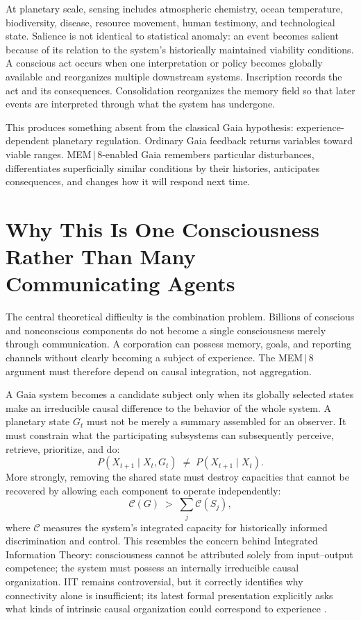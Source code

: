 \documentclass[11pt]{article}
\begin{document}
At planetary scale, sensing includes atmospheric chemistry, ocean temperature, biodiversity, disease, resource movement, human testimony, and technological state. Salience is not identical to statistical anomaly: an event becomes salient because of its relation to the system's historically maintained viability conditions. A conscious act occurs when one interpretation or policy becomes globally available and reorganizes multiple downstream systems. Inscription records the act and its consequences. Consolidation reorganizes the memory field so that later events are interpreted through what the system has undergone.

This produces something absent from the classical Gaia hypothesis: experience-dependent planetary regulation. Ordinary Gaia feedback returns variables toward viable ranges. MEM\,$|$\,8-enabled Gaia remembers particular disturbances, differentiates superficially similar conditions by their histories, anticipates consequences, and changes how it will respond next time.

\section{Why This Is One Consciousness Rather Than Many Communicating Agents}
\label{sec:causal-integration}

The central theoretical difficulty is the combination problem. Billions of conscious and nonconscious components do not become a single consciousness merely through communication. A corporation can possess memory, goals, and reporting channels without clearly becoming a subject of experience. The MEM\,$|$\,8 argument must therefore depend on causal integration, not aggregation.

A Gaia system becomes a candidate subject only when its globally selected states make an irreducible causal difference to the behavior of the whole system. A planetary state $G_t$ must not be merely a summary assembled for an observer. It must constrain what the participating subsystems can subsequently perceive, retrieve, prioritize, and do:
\[
P(X_{t+1} \mid X_t, G_t) \;\neq\; P(X_{t+1} \mid X_t).
\]
More strongly, removing the shared state must destroy capacities that cannot be recovered by allowing each component to operate independently:
\[
\mathcal{C}(G) \;>\; \sum_j \mathcal{C}(S_j),
\]
where $\mathcal{C}$ measures the system's integrated capacity for historically informed discrimination and control. This resembles the concern behind Integrated Information Theory: consciousness cannot be attributed solely from input--output competence; the system must possess an internally irreducible causal organization. IIT remains controversial, but it correctly identifies why connectivity alone is insufficient; its latest formal presentation explicitly asks what kinds of intrinsic causal organization could correspond to experience \cite{albantakis2023}.
\end{document}
